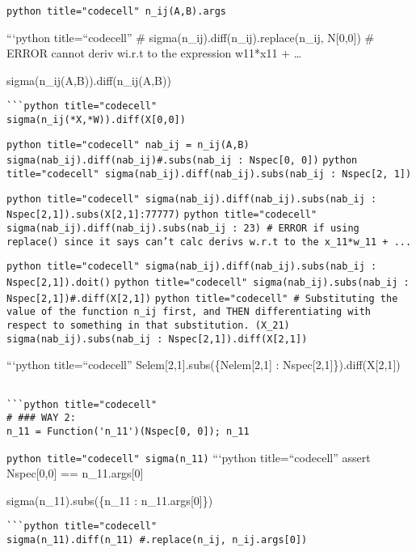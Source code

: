 \documentclass[
]{article}
\begin{document}
\texttt{python title="codecell" n_ij(A,B).args}

```python title=``codecell'' \# sigma(n\_ij).diff(n\_ij).replace(n\_ij,
N{[}0,0{]}) \# ERROR cannot deriv wi.r.t to the expression w11*x11 +
\ldots{}

sigma(n\_ij(A,B)).diff(n\_ij(A,B))

\begin{verbatim}
```python title="codecell"
sigma(n_ij(*X,*W)).diff(X[0,0])
\end{verbatim}

\texttt{python title="codecell" nab_ij = n_ij(A,B) sigma(nab_ij).diff(nab_ij)#.subs({nab_ij : Nspec[0, 0]})}
\texttt{python title="codecell" sigma(nab_ij).diff(nab_ij).subs({nab_ij : Nspec[2, 1]})}

\texttt{python title="codecell" sigma(nab_ij).diff(nab_ij).subs({nab_ij : Nspec[2,1]}).subs({X[2,1]:77777})}
\texttt{python title="codecell" sigma(nab_ij).diff(nab_ij).subs({nab_ij : 23}) # ERROR if using replace() since it says can't calc derivs w.r.t to the x_11*w_11 + ...}

\texttt{python title="codecell" sigma(nab_ij).diff(nab_ij).subs({nab_ij : Nspec[2,1]}).doit()}
\texttt{python title="codecell" sigma(nab_ij).subs({nab_ij : Nspec[2,1]})#.diff(X[2,1])}
\texttt{python title="codecell" # Substituting the value of the function n_ij first, and THEN differentiating with respect to something in that substitution. (X_21) sigma(nab_ij).subs({nab_ij : Nspec[2,1]}).diff(X[2,1])}

```python title=``codecell'' Selem{[}2,1{]}.subs(\{Nelem{[}2,1{]} :
Nspec{[}2,1{]}\}).diff(X{[}2,1{]})

\begin{verbatim}

```python title="codecell"
# ### WAY 2:
n_11 = Function('n_11')(Nspec[0, 0]); n_11
\end{verbatim}

\texttt{python title="codecell" sigma(n_11)} ```python
title=``codecell'' assert Nspec{[}0,0{]} == n\_11.args{[}0{]}

sigma(n\_11).subs(\{n\_11 : n\_11.args{[}0{]}\})

\begin{verbatim}
```python title="codecell"
sigma(n_11).diff(n_11) #.replace(n_ij, n_ij.args[0])
\end{verbatim}
\end{document}
